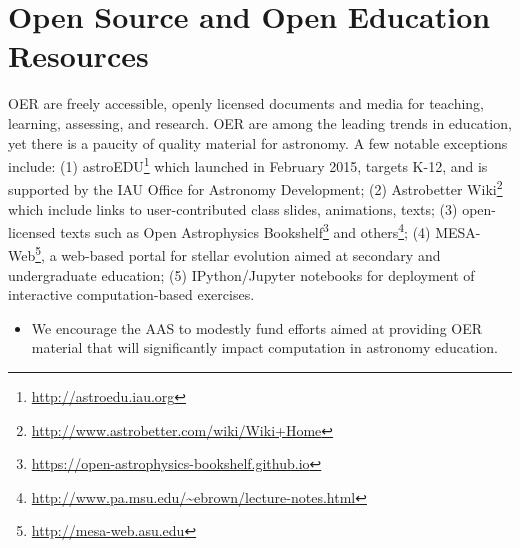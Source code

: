 \documentclass[11pt]{article}
\newenvironment{squishlist}                                                     
  {\begin{itemize}                                                              
    \addtolength{\itemsep}{-0.33\baselineskip}                                  
   }                                                                            
  { \end{itemize} }
\begin{document}




\section{Open Source and Open Education Resources}

OER are freely accessible, openly
licensed documents and media for teaching, learning,
assessing, and research. OER are among the leading trends in 
education, yet there is a paucity of quality material for
astronomy. A few notable exceptions include: (1)
astroEDU\footnote{\url{http://astroedu.iau.org}} which
launched in February 2015, targets K-12, and is supported by the IAU
Office for Astronomy Development; (2) Astrobetter
Wiki\footnote{\url{http://www.astrobetter.com/wiki/Wiki+Home}} which
include links to user-contributed class slides, animations, texts;
(3) open-licensed texts such as Open Astrophysics Bookshelf\footnote{\url{https://open-astrophysics-bookshelf.github.io}}
and others\footnote{\url{http://www.pa.msu.edu/~ebrown/lecture-notes.html}};
(4) MESA-Web\footnote{\url{http://mesa-web.asu.edu}}, a
web-based portal for stellar evolution aimed at secondary and undergraduate education;
(5) IPython/Jupyter notebooks for deployment of interactive computation-based exercises.

\begin{squishlist}
\item
We encourage the AAS to modestly fund efforts aimed at providing OER
material that will significantly impact computation in astronomy education.
\end{squishlist}
\end{document}
